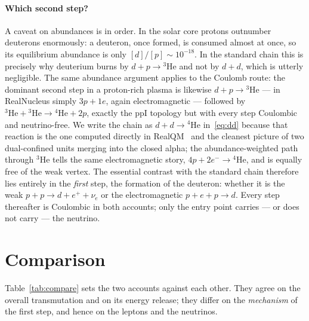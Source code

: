 \documentclass[11pt]{article}
\begin{document}
\paragraph{Which second step?} A caveat on abundances is in order. In the solar core protons outnumber
deuterons enormously: a deuteron, once formed, is consumed almost at once, so its equilibrium
abundance is only $[d]/[p]\sim10^{-18}$. In the standard chain this is precisely why deuterium burns by
$d+p\to{}^3\mathrm{He}$ and not by $d+d$, which is utterly negligible. The same abundance argument
applies to the Coulomb route: the dominant second step in a proton-rich plasma is likewise
$d+p\to{}^3\mathrm{He}$ --- in RealNucleus simply $3p+1e$, again electromagnetic --- followed by
${}^3\mathrm{He}+{}^3\mathrm{He}\to{}^4\mathrm{He}+2p$, exactly the ppI topology but with every step
Coulombic and neutrino-free. We write the chain as $d+d\to{}^4\mathrm{He}$ in~\eqref{eq:dd} because that
reaction is the one computed directly in RealQM~\cite{Johnson-RealNucleus} and the cleanest picture of
two dual-confined units merging into the closed alpha; the abundance-weighted path through
${}^3\mathrm{He}$ tells the same electromagnetic story, $4p+2e^-\to{}^4\mathrm{He}$, and is equally free
of the weak vertex. The essential contrast with the standard chain therefore lies entirely in the
\emph{first} step, the formation of the deuteron: whether it is the weak $p+p\to d+e^{+}+\nu_e$ or the
electromagnetic $p+e+p\to d$. Every step thereafter is Coulombic in both accounts; only the entry point
carries --- or does not carry --- the neutrino.

\section{Comparison}

Table~\ref{tab:compare} sets the two accounts against each other. They agree on the overall
transmutation and on its energy release; they differ on the \emph{mechanism} of the first step, and
hence on the leptons and the neutrinos.
\end{document}
